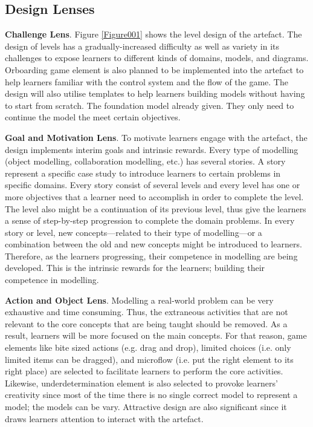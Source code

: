 \documentclass[runningheads,a4paper]{llncs}
\begin{document}
\subsection{Design Lenses}
\textbf{Challenge Lens}. Figure \ref{Figure001} shows the level design of the artefact. The design of levels has a gradually-increased difficulty as well as variety in its challenges to expose learners to different kinds of domains, models, and diagrams. Orboarding game element is also planned to be implemented into the artefact to help learners familiar with the control system and the flow of the game. The design will also utilise templates to help learners building models without having to start from scratch. The foundation model already given. They only need to continue the model the meet certain objectives.

\textbf{Goal and Motivation Lens}. To motivate learners engage with the artefact, the design implements interim goals and intrinsic rewards. Every type of modelling (object modelling, collaboration modelling, etc.) has several stories. A story represent a specific case study to introduce learners to certain problems in specific domains. Every story consist of several levels and every level has one or more objectives that a learner need to accomplish in order to complete the level. The level also might be a continuation of its previous level, thus give the learners a sense of step-by-step progression to complete the domain problems. In every story or level, new concepts---related to their type of modelling---or a combination between the old and new concepts might be introduced to learners. Therefore, as the learners progressing, their competence in modelling are being  developed. This is the intrinsic rewards for the learners; building their competence in modelling. 

\textbf{Action and Object Lens}. Modelling a real-world problem can be very exhaustive and time consuming. Thus, the extraneous activities that are not relevant to the core concepts that are being taught should be removed. As a result, learners will be more focused on the main concepts. For that reason, game elements like bite sized actions (e.g. drag and drop), limited choices (i.e. only limited items can be dragged), and microflow (i.e. put the right element to its right place) are selected to facilitate learners to perform the core activities. Likewise, underdetermination element is also selected to provoke learners' creativity since most of the time there is no single correct model to represent a model; the models can be vary. Attractive design are also significant since it draws learners attention to interact with the artefact.
\end{document}
